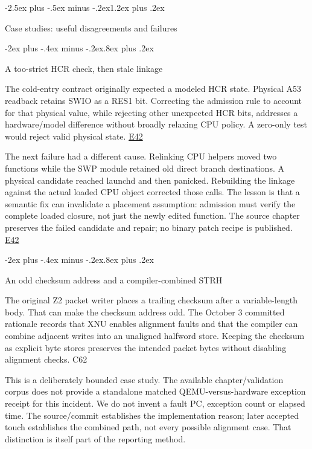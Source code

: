 \documentclass[10pt,letterpaper,twocolumn]{article}
\makeatletter
\renewcommand{\section}{\@startsection{section}{1}{0pt}
  {-2.5ex plus -.5ex minus -.2ex}{1.2ex plus .2ex}
  {\normalfont\large\bfseries\raggedright}}
\renewcommand{\subsection}{\@startsection{subsection}{2}{0pt}
  {-2ex plus -.4ex minus -.2ex}{.8ex plus .2ex}
  {\normalfont\normalsize\bfseries\raggedright}}
\makeatother
\begin{document}
\section{Case studies: useful disagreements and failures}

\subsection{A too-strict HCR check, then stale linkage}

The cold-entry contract originally expected a modeled HCR state. Physical A53 readback retains SWIO as a RES1 bit. Correcting the admission rule to account for that physical value, while rejecting other unexpected HCR bits, addresses a hardware/model difference without broadly relaxing CPU policy. A zero-only test would reject valid physical state. \hyperlink{e-E42}{\textsf{E42}}

The next failure had a different cause. Relinking CPU helpers moved two functions while the SWP module retained old direct branch destinations. A physical candidate reached launchd and then panicked. Rebuilding the linkage against the actual loaded CPU object corrected those calls. The lesson is that a semantic fix can invalidate a placement assumption: admission must verify the complete loaded closure, not just the newly edited function. The source chapter preserves the failed candidate and repair; no binary patch recipe is published. \hyperlink{e-E42}{\textsf{E42}}

\subsection{An odd checksum address and a compiler-combined STRH}

The original Z2 packet writer places a trailing checksum after a variable-length body. That can make the checksum address odd. The October 3 committed rationale records that XNU enables alignment faults and that the compiler can combine adjacent writes into an unaligned halfword store. Keeping the checksum as explicit byte stores preserves the intended packet bytes without disabling alignment checks. C62

This is a deliberately bounded case study. The available chapter/validation corpus does not provide a standalone matched QEMU-versus-hardware exception receipt for this incident. We do not invent a fault PC, exception count or elapsed time. The source/commit establishes the implementation reason; later accepted touch establishes the combined path, not every possible alignment case. That distinction is itself part of the reporting method.
\end{document}
